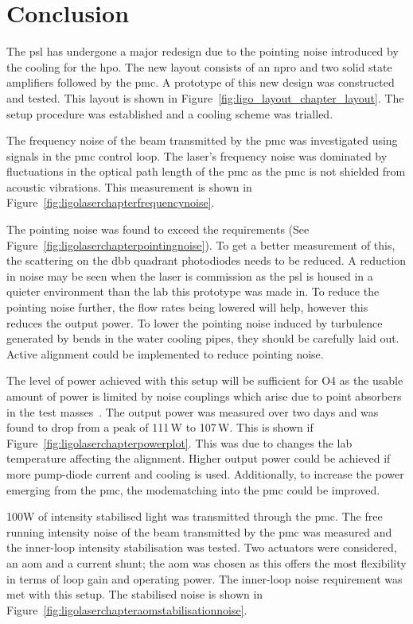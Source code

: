\section{Conclusion}
The \gls{psl} has undergone a major redesign due to the pointing noise introduced by the cooling for the \gls{hpo}. The new layout consists of an \gls{npro} and two solid state amplifiers followed by the \gls{pmc}. A prototype of this new design was constructed and tested. This layout is shown in Figure~\ref{fig:ligo_layout_chapter_layout}. The setup procedure was established and a cooling scheme was trialled. 
\par
The frequency noise of the beam transmitted by the \gls{pmc} was investigated using signals in the \gls{pmc} control loop. The laser's frequency noise was dominated by fluctuations in the optical path length of the \gls{pmc} as the \gls{pmc} is not shielded from acoustic vibrations. This measurement is shown in Figure~\ref{fig:ligolaserchapterfrequencynoise}.
\par
The pointing noise was found to exceed the requirements (See Figure~\ref{fig:ligolaserchapterpointingnoise}). To get a better measurement of this, the scattering on the \gls{dbb} quadrant photodiodes needs to be reduced. A reduction in noise may be seen when the laser is commission as the \gls{psl} is housed in a quieter environment than the lab this prototype was made in. To reduce the pointing noise further, the flow rates being lowered will help, however this reduces the output power. To lower the pointing noise induced by turbulence generated by bends in the water cooling pipes, they should be carefully laid out. Active alignment could be implemented to reduce pointing noise. 
\par
The level of power achieved with this setup will be sufficient for O4 as the usable amount of power is limited by noise couplings which arise due to point absorbers in the test masses~\cite{Buikema2020}. The output power was measured over two days and was found to drop from a peak of 111\,\si{\watt} to 107\,\si{\watt}. This is shown if Figure~\ref{fig:ligolaserchapterpowerplot}. This was due to changes the lab temperature affecting the alignment. Higher output power could be achieved if more pump-diode current and cooling is used. Additionally, to increase the power emerging from the \gls{pmc}, the modematching into the \gls{pmc} could be improved.
\par
100W of intensity stabilised light was transmitted through the \gls{pmc}. The free running intensity noise of the beam transmitted by the \gls{pmc} was measured and the inner-loop intensity stabilisation was tested. Two actuators were considered, an \gls{aom} and a current shunt; the \gls{aom} was chosen as this offers the most flexibility in terms of loop gain and operating power. The inner-loop noise requirement was met with this setup. The stabilised noise is shown in Figure~\ref{fig:ligolaserchapteraomstabilisationnoise}.
